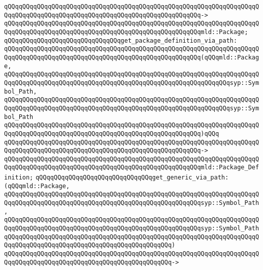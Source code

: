 \verb|qQQqqQQqqQQqqQQqqQQqqQQqqQQqqQQqqQQqqQQqqQQqqQQqqQQqqQQqqQQqqQQqqQQqqQQqqQQqqQQqqQQqqQQqqQQqqQQqqQQqqQQqqQQqqQQqqQQqqQQqqQQq->|\newline
\verb|qQQqqQQqqQQqqQQqqQQqqQQqqQQqqQQqqQQqqQQqqQQqqQQqqQQqqQQqqQQqqQQqqQQqqQQqqQQqqQQqqQQqqQQqqQQqqQQqqQQqqQQqqQQqqQQqqQQqqQQqqQQqmld::Package;|\newline
\newline
\verb|qQQqqQQqqQQqqQQqqQQqqQQqqQQqqQQqget_package_definition_via_path:|\newline
\verb|qQQqqQQqqQQqqQQqqQQqqQQqqQQqqQQqqQQqqQQqqQQqqQQqqQQqqQQqqQQqqQQqqQQqqQQqqQQqqQQqqQQqqQQqqQQqqQQqqQQqqQQqqQQqqQQqqQQqqQQqqQQq(qQQqmld::Package,|\newline
\verb|qQQqqQQqqQQqqQQqqQQqqQQqqQQqqQQqqQQqqQQqqQQqqQQqqQQqqQQqqQQqqQQqqQQqqQQqqQQqqQQqqQQqqQQqqQQqqQQqqQQqqQQqqQQqqQQqqQQqqQQqqQQqqQQqqQQqsyp::Symbol_Path,|\newline
\verb|qQQqqQQqqQQqqQQqqQQqqQQqqQQqqQQqqQQqqQQqqQQqqQQqqQQqqQQqqQQqqQQqqQQqqQQqqQQqqQQqqQQqqQQqqQQqqQQqqQQqqQQqqQQqqQQqqQQqqQQqqQQqqQQqqQQqsyp::Symbol_Path|\newline
\verb|qQQqqQQqqQQqqQQqqQQqqQQqqQQqqQQqqQQqqQQqqQQqqQQqqQQqqQQqqQQqqQQqqQQqqQQqqQQqqQQqqQQqqQQqqQQqqQQqqQQqqQQqqQQqqQQqqQQqqQQqqQQq)qQQq|\newline
\verb|qQQqqQQqqQQqqQQqqQQqqQQqqQQqqQQqqQQqqQQqqQQqqQQqqQQqqQQqqQQqqQQqqQQqqQQqqQQqqQQqqQQqqQQqqQQqqQQqqQQqqQQqqQQqqQQqqQQqqQQqqQQq->|\newline
\verb|qQQqqQQqqQQqqQQqqQQqqQQqqQQqqQQqqQQqqQQqqQQqqQQqqQQqqQQqqQQqqQQqqQQqqQQqqQQqqQQqqQQqqQQqqQQqqQQqqQQqqQQqqQQqqQQqqQQqqQQqqQQqmld::Package_Definition;|\newline
\newline
\verb|qQQqqQQqqQQqqQQqqQQqqQQqqQQqqQQqget_generic_via_path:(qQQqmld::Package,|\newline
\verb|qQQqqQQqqQQqqQQqqQQqqQQqqQQqqQQqqQQqqQQqqQQqqQQqqQQqqQQqqQQqqQQqqQQqqQQqqQQqqQQqqQQqqQQqqQQqqQQqqQQqqQQqqQQqqQQqqQQqqQQqqQQqsyp::Symbol_Path,|\newline
\verb|qQQqqQQqqQQqqQQqqQQqqQQqqQQqqQQqqQQqqQQqqQQqqQQqqQQqqQQqqQQqqQQqqQQqqQQqqQQqqQQqqQQqqQQqqQQqqQQqqQQqqQQqqQQqqQQqqQQqqQQqqQQqsyp::Symbol_Path|\newline
\verb|qQQqqQQqqQQqqQQqqQQqqQQqqQQqqQQqqQQqqQQqqQQqqQQqqQQqqQQqqQQqqQQqqQQqqQQqqQQqqQQqqQQqqQQqqQQqqQQqqQQqqQQqqQQqqQQqqQQq)|\newline
\verb|qQQqqQQqqQQqqQQqqQQqqQQqqQQqqQQqqQQqqQQqqQQqqQQqqQQqqQQqqQQqqQQqqQQqqQQqqQQqqQQqqQQqqQQqqQQqqQQqqQQqqQQqqQQqqQQqqQQq->|\newline
